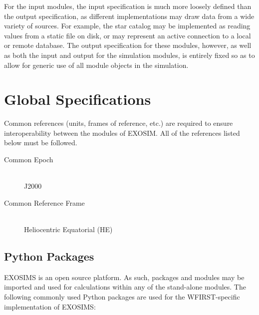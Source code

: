 \documentclass[cleanfoot]{asme2ej}
\begin{document}
For the input modules, the input specification is much more loosely defined than the output specification, as different implementations may draw data from a wide variety of sources.  For example, the star catalog may be implemented as reading values from a static file on disk, or may represent an active connection to a local or remote database.  The output specification for these modules, however, as well as both the input and output for the simulation modules, is entirely fixed so as to allow for generic use of all module objects in the simulation.


\section{Global Specifications}
Common references (units, frames of reference, etc.) are required to ensure interoperability between the modules of EXOSIM.  All of the references listed below must be followed.

\begin{description}
    \item[Common Epoch] \hfill \\ J2000
    \item[Common Reference Frame] \hfill \\ Heliocentric Equatorial (HE)
\end{description}

\subsection{Python Packages} 
EXOSIMS is an open source platform.  As such, packages and modules may be imported and used for calculations within any of the stand-alone modules.  The following commonly used Python packages are used for the WFIRST-specific implementation of EXOSIMS:
\end{document}
